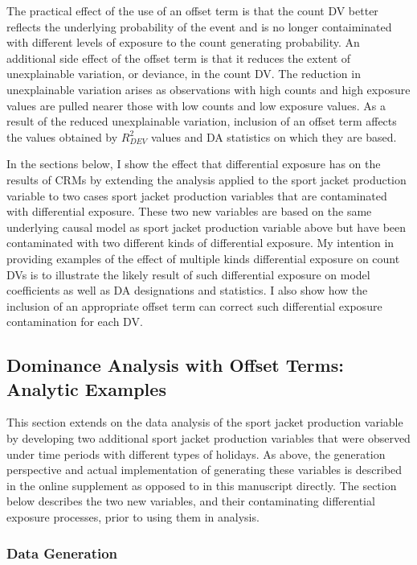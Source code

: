\documentclass[ShortAfour,times,sageapa]{sagej}
\begin{document}
	The practical effect of the use of an offset term is that the count DV better reflects the underlying probability of the event and is no longer contaiminated with different levels of exposure to the count generating probability.
	An additional side effect of the offset term is that it reduces the extent of unexplainable variation, or deviance, in the count DV.
	The reduction in unexplainable variation arises as observations with high counts and high exposure values are pulled nearer those with low counts and low exposure values.	
	As a result of the reduced unexplainable variation, inclusion of an offset term affects the values obtained by  $R^2_{DEV}$ values and DA statistics on which they are based.
	
	In the sections below, I show the effect that differential exposure has on the results of CRMs by extending the analysis applied to the sport jacket production variable to two cases sport jacket production variables that are contaminated with differential exposure.
	These two new variables are based on the same underlying causal model as sport jacket production variable above but have been contaminated with two different kinds of differential exposure.
	My intention in providing examples of the effect of multiple kinds differential exposure on count DVs is to illustrate the likely result of such differential exposure on model coefficients as well as DA designations and statistics.
	I also show how the inclusion of an appropriate offset term can correct such differential exposure contamination for each DV.
	
	
	\subsection{Dominance Analysis with Offset Terms: Analytic Examples}
	
	This section extends on the data analysis of the sport jacket production variable by developing two additional sport jacket production variables that were observed under time periods with different types of holidays.	
	As above, the generation perspective and actual implementation of generating these variables is described in the online supplement as opposed to in this manuscript directly. The section below describes the two new variables, and their contaminating differential exposure processes, prior to using them in analysis.
	
		\subsubsection{Data Generation}
		
\end{document}
